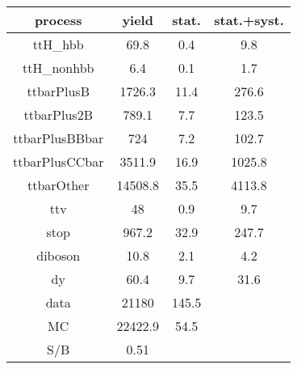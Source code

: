 \begin{tabular}{cccc}
\hline
    process     &  yield  &  stat.  &  stat.+syst.  \\
\hline
    ttH\_hbb     &  69.8   &   0.4   &      9.8      \\
   ttH\_nonhbb   &   6.4   &   0.1   &      1.7      \\
   ttbarPlusB   & 1726.3  &  11.4   &     276.6     \\
  ttbarPlus2B   &  789.1  &   7.7   &     123.5     \\
 ttbarPlusBBbar &   724   &   7.2   &     102.7     \\
 ttbarPlusCCbar & 3511.9  &  16.9   &    1025.8     \\
   ttbarOther   & 14508.8 &  35.5   &    4113.8     \\
      ttv       &   48    &   0.9   &      9.7      \\
      stop      &  967.2  &  32.9   &     247.7     \\
    diboson     &  10.8   &   2.1   &      4.2      \\
       dy       &  60.4   &   9.7   &     31.6      \\
\hline
      data      &  21180  &  145.5  &               \\
       MC       & 22422.9 &  54.5   &               \\
\hline
      S/B       &  0.51   &         &               \\
\hline
\end{tabular}
